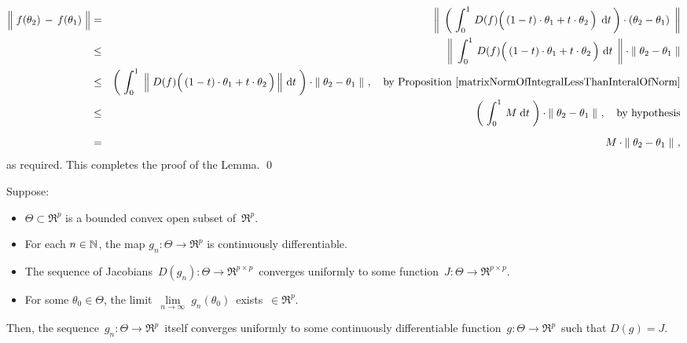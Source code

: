 \begin{eqnarray*}
\left\Vert\; f(\theta_{2}) \, \overset{{\color{white}.}}{-} \, f(\theta_{1}) \;\right\Vert
& = &
	\left\Vert\;\,
		\left(\;\int_{0}^{1}\, D(f)\!\left(\,(1-t)\cdot \theta_{1} \overset{{\color{white}.}}{+} t \cdot \theta_{2} \,\right) \;\d t\,\right)
		\cdot (\theta_{2} - \theta_{1})
		\,\;\right\Vert
\\
& \leq &
	\left\Vert\;\,
		\int_{0}^{1}\, D(f)\!\left(\,(1-t)\cdot \theta_{1} \overset{{\color{white}.}}{+} t \cdot \theta_{2} \,\right) \,\d t
		\,\;\right\Vert
	\cdot 
	\left\Vert\; \theta_{2} - \theta_{1} \;\right\Vert
\\
& \leq &
	\left(\;
		\int_{0}^{1}\;
			\left\Vert\;
				D(f)\!\left(\,(1-t)\cdot \theta_{1} \overset{{\color{white}.}}{+} t \cdot \theta_{2} \,\right) 
				\,\right\Vert
			\,\d t
		\;\right)
	\cdot 
	\left\Vert\; \theta_{2} - \theta_{1} \;\right\Vert\,,
	\quad
	\textnormal{by Proposition \ref{matrixNormOfIntegralLessThanInteralOfNorm}}
\\
& \leq &
	\left(\; \int_{0}^{1}\, M \;\d t \;\right)
	\cdot
	\left\Vert\; \theta_{2} - \theta_{1} \;\right\Vert\,,
	\quad
	\textnormal{by hypothesis}
\\
& = &
	\overset{{\color{white}-}}{M} \cdot \left\Vert\; \theta_{2} - \theta_{1} \;\right\Vert\,,
\end{eqnarray*}
as required.
This completes the proof of the Lemma.
\qed


\vskip 1.0cm
\begin{lemma}
\mbox{}\vskip 0.1cm
\noindent
Suppose:
\begin{itemize}
\item
	$\Theta \subset \Re^{p}$ is a bounded convex open subset of \,$\Re^{p}$.
\item
	For each $n\in\mathbb{N}$, the map $g_{n} : \Theta \longrightarrow \Re^{p}$ is continuously differentiable.
\item
	The sequence of Jacobians
	\,$D(g_{n}) : \Theta \longrightarrow \Re^{p \times p}$\,
	converges uniformly to some function
	\,$J : \Theta \longrightarrow \Re^{p \times p}$.
\item
	For some $\theta_{0} \in \Theta$, the limit
	\,$\underset{n\rightarrow\infty}{\lim}\;g_{n}(\theta_{0})$\,
	exists \,$\in \Re^{p}$.
\end{itemize}
Then, the sequence
\,$g_{n} : \Theta \longrightarrow \Re^{p}$\,
itself converges uniformly to some continuously differentiable function
\,$g : \Theta \longrightarrow \Re^{p}$\,
such that $D(g) = J$.
\end{lemma}
\proof

